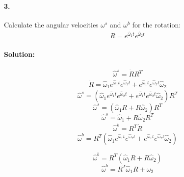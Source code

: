 \documentclass[english]{article}
\begin{document}
\paragraph{3.}

Calculate the angular velocities $\omega^s$ and $\omega^b$ for the rotation:
\begin{align}
R = e^{\hat{\omega}_1 t} e^{\hat{\omega}_2 t}
\end{align}

\paragraph{Solution:}
\begin{align}
\hat{\omega}^s  = \dot{R}R^T
\end{align}
\begin{align}
\dot{R} = \hat{\omega}_1e^{\hat{\omega}_1t}e^{\hat{\omega}_2t} + e^{\hat{\omega}_1t}e^{\hat{\omega}_2t}\hat{\omega}_2
\end{align}
$$  \hat{\omega}^s =(\hat{\omega}_1e^{\hat{\omega}_1t}e^{\hat{\omega}_2t} + e^{\hat{\omega}_1t}e^{\hat{\omega}_2t}\hat{\omega}_2)R^T
$$
$$
\hat{\omega}^s =(\hat{\omega}_1R + R\hat{\omega}_2)R^T
$$
$$
\hat{\omega}^s =\hat{\omega}_1 + R\hat{\omega}_2R^T
$$
\begin{align}
\hat{\omega}^b = R^T\dot{R} 
\end{align}
$$
\hat{\omega}^b = R^T( \hat{\omega}_1e^{\hat{\omega}_1t}e^{\hat{\omega}_2t} + e^{\hat{\omega}_1t}e^{\hat{\omega}_2t}\hat{\omega}_2) 
$$

$$
\hat{\omega}^b = R^T(\hat{\omega}_1R  + R\hat{\omega}_2) 
$$
$$
\hat{\omega}^b =  R^T\hat{\omega}_1R  + \hat{\omega}_2 
$$
\end{document}

